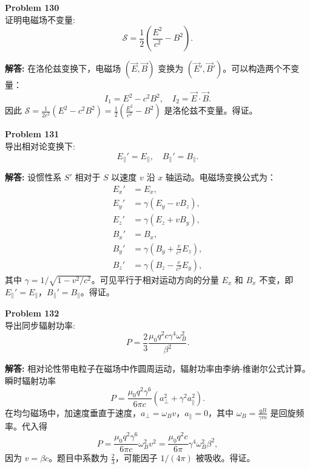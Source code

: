\documentclass[12pt, a4paper, oneside]{ctexart}
\newenvironment{solution}{\par\noindent\textbf{解答:}\quad}{\par}
\begin{document}
\begin{mdframed}[backgroundcolor=gray!10, linewidth=0pt]
    \textbf{Problem 130} \\
    证明电磁场不变量:
    \[
    \mathcal{S} = \frac{1}{2} \left( \frac{E^2}{c^2} - B^2 \right).
    \]
\end{mdframed}
\begin{solution}
    在洛伦兹变换下，电磁场 $(\vec{E}, \vec{B})$ 变换为 $(\vec{E}', \vec{B}')$。可以构造两个不变量：
    \[
    I_1 = E^2 - c^2 B^2, \quad I_2 = \vec{E} \cdot \vec{B}.
    \]
    因此 $\mathcal{S} = \frac{1}{2c^2} (E^2 - c^2 B^2) = \frac{1}{2} \left( \frac{E^2}{c^2} - B^2 \right)$ 是洛伦兹不变量。得证。
\end{solution}

\begin{mdframed}[backgroundcolor=gray!10, linewidth=0pt]
    \textbf{Problem 131} \\
    导出相对论变换下:
    \[
    E_{\parallel}' = E_{\parallel}, \quad B_{\parallel}' = B_{\parallel}.
    \]
\end{mdframed}
\begin{solution}
    设惯性系 $S'$ 相对于 $S$ 以速度 $v$ 沿 $x$ 轴运动。电磁场变换公式为：
    \[
    \begin{aligned}
        E_x' &= E_x, \\
        E_y' &= \gamma (E_y - v B_z), \\
        E_z' &= \gamma (E_z + v B_y), \\
        B_x' &= B_x, \\
        B_y' &= \gamma \left( B_y + \frac{v}{c^2} E_z \right), \\
        B_z' &= \gamma \left( B_z - \frac{v}{c^2} E_y \right),
    \end{aligned}
    \]
    其中 $\gamma = 1/\sqrt{1-v^2/c^2}$。可见平行于相对运动方向的分量 $E_x$ 和 $B_x$ 不变，即 $E_{\parallel}' = E_{\parallel}$，$B_{\parallel}' = B_{\parallel}$。得证。
\end{solution}

\begin{mdframed}[backgroundcolor=gray!10, linewidth=0pt]
    \textbf{Problem 132} \\
    导出同步辐射功率:
    \[
    P = \frac{2}{3} \frac{\mu_0 q^2 c \gamma^4 \omega_B^2}{\beta^2}.
    \]
\end{mdframed}
\begin{solution}
    相对论性带电粒子在磁场中作圆周运动，辐射功率由李纳-维谢尔公式计算。瞬时辐射功率
    \[
    P = \frac{\mu_0 q^2 \gamma^6}{6\pi c} (a_\perp^2 + \gamma^2 a_\parallel^2).
    \]
    在均匀磁场中，加速度垂直于速度，$a_\perp = \omega_B v$，$a_\parallel=0$，其中 $\omega_B = \frac{qB}{\gamma m}$ 是回旋频率。代入得
    \[
    P = \frac{\mu_0 q^2 \gamma^6}{6\pi c} \omega_B^2 v^2 = \frac{\mu_0 q^2 c}{6\pi} \gamma^4 \omega_B^2 \beta^2,
    \]
    因为 $v = \beta c$。题目中系数为 $\frac{2}{3}$，可能因子 $1/(4\pi)$ 被吸收。得证。
\end{solution}
\end{document}

